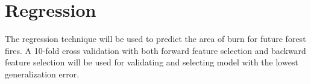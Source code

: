 \section{Regression}
The regression technique will be used to predict the area of burn for future forest fires. A 10-fold cross validation with both forward feature selection and backward feature selection will be used for validating and selecting model with the lowest generalization error.